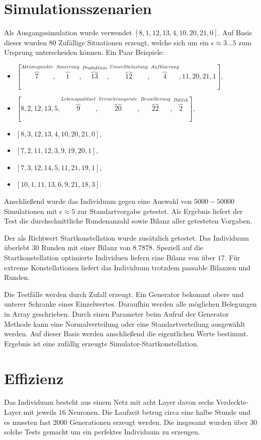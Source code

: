 \section{Simulationsszenarien}
Als Ausgangssimulation wurde verwendet \ensuremath{[8, 1, 12, 13, 4, 10, 20, 21, 0]}. Auf Basis dieser wurden $80$ Zufällige Situationen erzeugt, welche sich um ein \ensuremath{\epsilon \approx 3...5}  zum Ursprung unterscheiden können. Ein Paar Beispiele: 
\begin{itemize}
\item\ensuremath{[\overbrace{7}^{Aktionspunkte},\overbrace{1}^{Sanierung},	\overbrace{13}^{Produktion},	\overbrace{12}^{Umweltbelastung},	\overbrace{4}^{Aufklaerung},	11,	20,	21,	1]},
\item\ensuremath{[8,	2,	12,	13,	5,	\overbrace{9}^{Lebensqualitaet}, \overbrace{20}^{Vermehrungsrate},	\overbrace{22}^{Bevoelkerung},	\overbrace{2}^{Politik}]},
\item\ensuremath{[8,	3,	12,	13,	4,	10,	20,	21,	0]},
\item\ensuremath{[7,	2,	11,	12,	3,	9,	19,	20,	1]},
\item\ensuremath{[7,	3,	12,	14,	5,	11,	21,	19,	1]},
\item\ensuremath{[10,	1,	11,	13,	6,	9,	21,	18,	3]}.
\end{itemize}

Anschließend wurde das Individuum gegen eine Auswahl von $5000 - 50000$ Simulationen mit \ensuremath{\epsilon \approx 5} zur Standartvorgabe getestet. Als Ergebnis liefert der Test die durchschnittliche Rundenanzahl sowie Bilanz aller getesteten Vorgaben.

Der als Richtwert Startkonstellation wurde zusätzlich getestet. Das Individuum überlebt $30$ Runden mit einer Bilanz von $8.78\overline{78}$. Speziell auf die Startkonstellation optimierte Individuen liefern eine Bilanz von über $17$. Für extreme Konstellationen liefert das Individuum trotzdem passable Bilanzen und Runden.

Die Testfälle werden durch Zufall erzeugt. Ein Generator bekommt obere und unterer Schranke eines Einzelwertes. Daraufhin werden alle möglichen Belegungen in Array geschrieben. Durch einen Parameter beim Aufruf der Generator Methode kann eine Normalverteilung oder eine Standartverteilung ausgewählt werden. Auf dieser Basis werden anschließend die eigentlichen Werte bestimmt. Ergebnis ist eine zufällig erzeugte Simulator-Startkonstellation.

\section{Effizienz}
Das Individuum besteht aus einem Netz mit acht Layer davon sechs Verdeckte-Layer mit jeweils $16$ Neuronen. Die Laufzeit betrug circa eine halbe Stunde und es mussten fast $2000$ Generationen erzeugt werden. Die insgesamt wurden über $30$ solche Tests gemacht um ein perfektes Individuum zu erzeugen.

